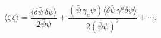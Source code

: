 \begin{equation}\label{eq:PF}
\langle\zeta\,\zeta\rangle
  =\frac{\langle\delta\bar{\psi}\,\delta\psi\rangle}
{2\bar{\psi}\psi}+
\frac{(\bar{\psi}\,\gamma_a\psi)
  \langle\delta\bar{\psi}\,\gamma^a\delta\psi\rangle}
{2(\bar{\psi}\psi)^2}+\cdots .
\end{equation}

